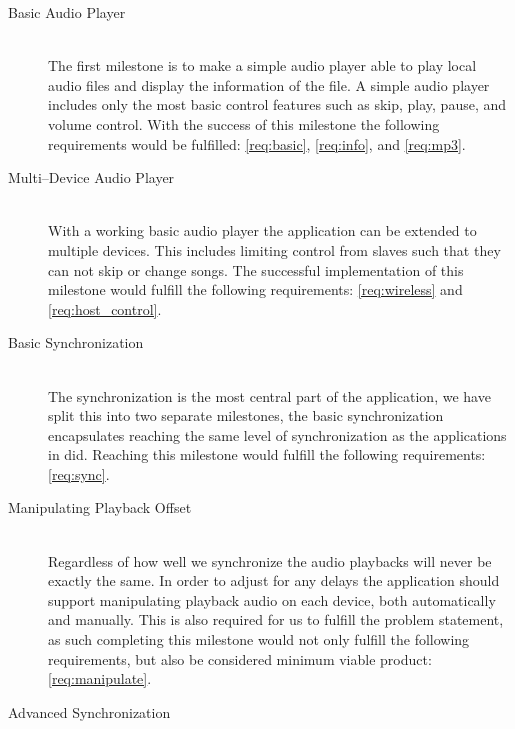 \begin{description}
    \item [Basic Audio Player] \hfill \\
        The first milestone is to make a simple audio player able to play local audio files and display the information of the file.
        A simple audio player includes only the most basic control features such as skip, play, pause, and volume control.
        With the success of this milestone the following requirements would be fulfilled: \ref{req:basic}, \ref{req:info}, and \ref{req:mp3}.
    \item [Multi--Device Audio Player\label{milestone:multidevice}] \hfill \\
        With a working basic audio player the application can be extended to multiple devices.
        This includes limiting control from slaves such that they can not skip or change songs.
        The successful implementation of this milestone would fulfill the following requirements: \ref{req:wireless} and \ref{req:host_control}.
    \item [Basic Synchronization\label{milestone:basic}] \hfill \\
        The synchronization is the most central part of the application, we have split this into two separate milestones, the basic synchronization encapsulates reaching the same level of synchronization as the applications in  did.
        Reaching this milestone would fulfill the following requirements: \ref{req:sync}.
    \item [Manipulating Playback Offset] \hfill \\ %
        Regardless of how well we synchronize the audio playbacks will never be exactly the same.
        In order to adjust for any delays the application should support manipulating playback audio on each device, both automatically and manually.
        This is also required for us to fulfill the problem statement, as such completing this milestone would not only fulfill the following requirements, but also be considered minimum viable product: \ref{req:manipulate}.
    \item [Advanced Synchronization] \hfill \\

\end{description}
